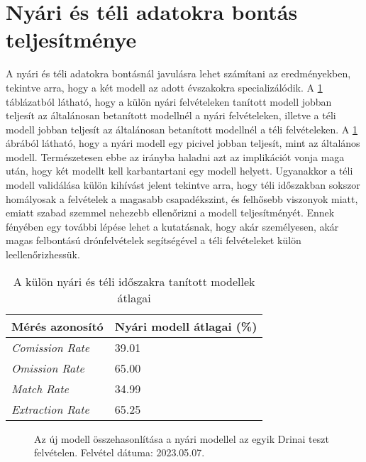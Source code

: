 \section{Nyári és téli adatokra bontás teljesítménye}
\label{ch:summer-winter-models}

A nyári és téli adatokra bontásnál javulásra lehet számítani az eredményekben, tekintve arra, hogy a két modell az adott évszakokra specializálódik. A \ref{tab:summer-winter-split} táblázatból  látható, hogy a külön nyári felvételeken tanított modell jobban teljesít az általánosan betanított modellnél a nyári felvételeken, illetve a téli modell jobban teljesít az általánosan betanított modellnél a téli felvételeken. A \ref{fig:summer-vs-new} ábrából látható, hogy a nyári modell egy picivel jobban teljesít, mint az általános modell. Természetesen ebbe az irányba haladni azt az implikációt vonja maga után, hogy két modellt kell karbantartani egy modell helyett. Ugyanakkor a téli modell validálása külön kihívást jelent tekintve arra, hogy téli időszakban sokszor homályosak a felvételek a magasabb csapadékszint, és felhősebb viszonyok miatt, emiatt szabad szemmel nehezebb ellenőrizni a modell teljesítményét. Ennek fényében egy további lépése lehet a kutatásnak, hogy akár személyesen, akár magas felbontású drónfelvételek segítségével a téli felvételeket külön leellenőrizhessük. 

\begin{table}[H]
	\centering
	\begin{tabular}{ | p{} | p{} | }
		\hline
		\textbf{Mérés azonosító} & \textbf{Nyári modell átlagai (\%)} \\
		\hline \hline
		\emph{Comission Rate} & 39.01 \\
		\hline
		\emph{Omission Rate} & 65.00  \\
		\hline
		\emph{Match Rate} & 34.99  \\
		\hline
        \emph{Extraction Rate} & 65.25 \\
		\hline
	\end{tabular}
	\caption{A külön nyári és téli időszakra tanított modellek átlagai}
	\label{tab:summer-winter-split}
\end{table}

\begin{figure}[H]
	\centering
	\hspace{5pt}
	\hspace{5pt}
	\caption{Az új modell összehasonlítása a nyári modellel az egyik Drinai teszt felvételen. Felvétel dátuma: 2023.05.07.}
	\label{fig:summer-vs-new}
\end{figure}

